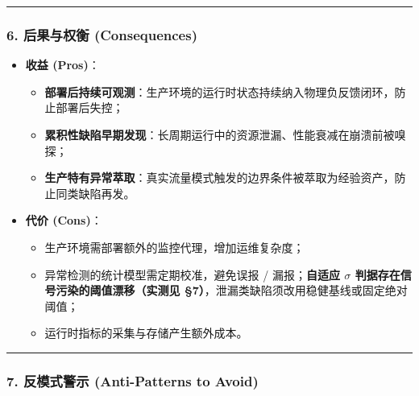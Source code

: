 \begin{center}\rule{0.5\linewidth}{0.5pt}\end{center}

\subsubsection{6. 后果与权衡
(Consequences)}\label{ux540eux679cux4e0eux6743ux8861-consequences-22}

\begin{itemize}
\item
  \textbf{收益 (Pros)}：

  \begin{itemize}
  \item
    \textbf{部署后持续可观测}：生产环境的运行时状态持续纳入物理负反馈闭环，防止部署后失控；
  \item
    \textbf{累积性缺陷早期发现}：长周期运行中的资源泄漏、性能衰减在崩溃前被嗅探；
  \item
    \textbf{生产特有异常萃取}：真实流量模式触发的边界条件被萃取为经验资产，防止同类缺陷再发。
  \end{itemize}
\item
  \textbf{代价 (Cons)}：

  \begin{itemize}
  \item
    生产环境需部署额外的监控代理，增加运维复杂度；
  \item
    异常检测的统计模型需定期校准，避免误报 / 漏报；\textbf{自适应
    \(\sigma\) 判据存在信号污染的阈值漂移（实测见
    §7）}，泄漏类缺陷须改用稳健基线或固定绝对阈值；
  \item
    运行时指标的采集与存储产生额外成本。
  \end{itemize}
\end{itemize}

\begin{center}\rule{0.5\linewidth}{0.5pt}\end{center}

\subsubsection{7. 反模式警示 (Anti-Patterns to
Avoid)}\label{ux53cdux6a21ux5f0fux8b66ux793a-anti-patterns-to-avoid-22}

